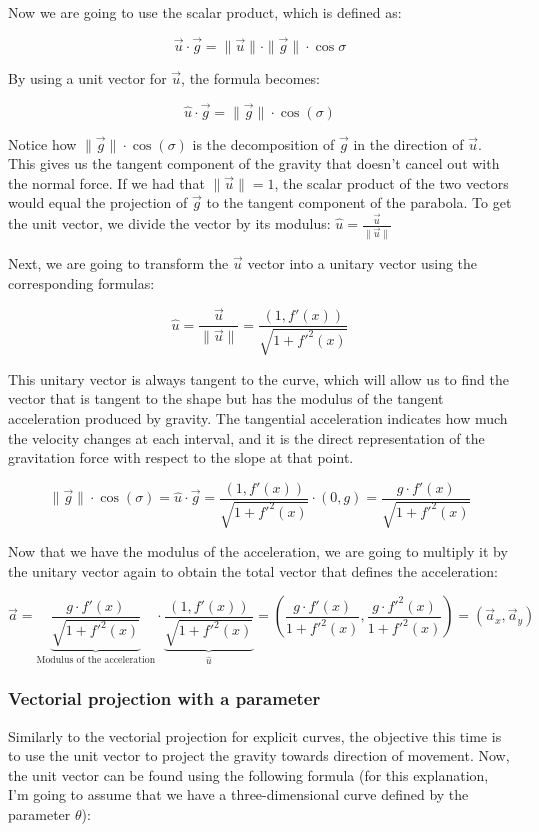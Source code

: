 \documentclass[12pt,twoside,a4paper]{article}
\newcommand{\ds}{\displaystyle}
\begin{document}
	Now we are going to use the scalar product, which is defined as:
	
	$$\vec{u} \cdot \vec{g} = \|\vec{u}\| \cdot \|\vec{g}\| \cdot \cos \sigma$$
	
	By using a unit vector for $\vec{u}$, the formula becomes:
	
	$$\hat{u} \cdot \vec{g} = \|\vec{g}\| \cdot \cos(\sigma)$$
	
	Notice how $\|\vec{g}\| \cdot \cos(\sigma)$ is the decomposition of $\vec{g}$ in the direction of $\vec{u}$. This gives us the tangent component of the gravity that doesn't cancel out with the normal force. If we had that $\|\vec{u}\| = 1$, the scalar product of the two vectors would equal the projection of $\vec{g}$ to the tangent component of the parabola. To get the unit vector, we divide the vector by its modulus: $\ds \hat{u} = \frac{\vec{u}}{\|\vec{u}\|}$
	
	Next, we are going to transform the $\vec{u}$ vector into a unitary vector using the corresponding formulas:
	
	$$\hat{u} = \frac{\vec{u}}{\|\vec{u}\|} = \frac{(1, f'(x))}{\sqrt{1 + f'^2(x)}}$$
	
	This unitary vector is always tangent to the curve, which will allow us to find the vector that is tangent to the shape but has the modulus of the tangent acceleration produced by gravity. The tangential acceleration indicates how much the velocity changes at each interval, and it is the direct representation of the gravitation force with respect to the slope at that point.
	
	$$\|\vec{g}\| \cdot \cos(\sigma) = \hat{u} \cdot \vec{g} = \frac{(1, f'(x))}{\sqrt{1 + f'^2(x)}} \cdot (0, g) = \frac{g \cdot f'(x)}{\sqrt{1 + f'^2(x)}}$$
	
	Now that we have the modulus of the acceleration, we are going to multiply it by the unitary vector again to obtain the total vector that defines the acceleration:
	
	$$\vec{a} = \underset{\text{Modulus of the acceleration}}{\underbrace{\frac{g \cdot f'(x)}{\sqrt{1 + f'^2(x)}}}} \cdot \underset{\hat{u}}{\underbrace{\frac{(1, f'(x))}{\sqrt{1 + f'^2(x)}}}} = \left(\frac{g \cdot f'(x)}{1 + f'^2(x)}, \frac{g \cdot f'^2(x)}{1 + f'^2(x)}\right) = (\vec{a}_x, \vec{a}_y)$$

	\subsubsection*{Vectorial projection with a parameter}
	Similarly to the vectorial projection for explicit curves, the objective this time is to use the unit vector to project the gravity towards direction of movement. Now, the unit vector can be found using the following formula (for this explanation, I'm going to assume that we have a three-dimensional curve defined by the parameter $\theta$):
	
\end{document}
